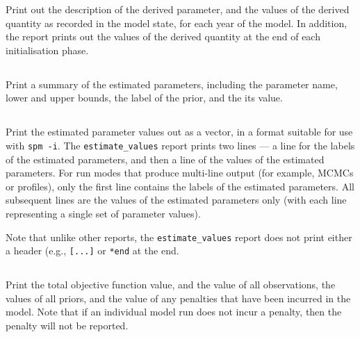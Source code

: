 Print out the description of the derived parameter, and the values of the derived quantity as recorded in the model state, for each year of the model. In addition, the report prints out the values of the derived quantity at the end of each initialisation phase.

\subsection{}

Print a summary of the estimated parameters, including the parameter name, lower and upper bounds, the label of the prior, and the its value.

\subsection{}

Print the estimated parameter values out as a vector, in a format suitable for use with \texttt{spm -i}. The \texttt{estimate\_values} report prints two lines --- a line for the labels of the estimated parameters, and then a line of the values of the estimated parameters. For run modes that produce multi-line output (for example, MCMCs or profiles), only the first line contains the labels of the  estimated parameters. All subsequent lines are the values of the estimated parameters only (with each line representing a single set of parameter values). 

Note that unlike other reports, the \texttt{estimate\_values} report does not print either a header (e.g., \texttt{[...]} or \texttt{*end} at the end. 

\subsection{}

Print the total objective function value, and the value of all observations, the values of all priors, and the value of any penalties that have been incurred in the model. Note that if an individual model run does not incur a penalty, then the penalty will not be reported.

\subsection{}

